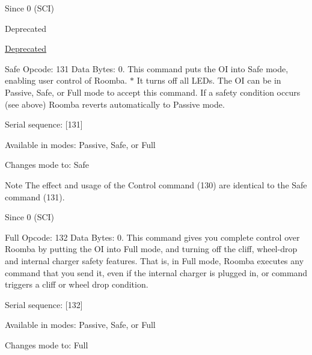 \begin{Desc}
\begin{description}
\begin{DoxySince}{Since}
0 (S\+C\+I)
\end{DoxySince}
\begin{DoxyRefDesc}{Deprecated}
\item[\hyperlink{deprecated__deprecated000001}{Deprecated}]\end{DoxyRefDesc}
\item[{\em 
\hypertarget{group__roomba-lib_gga305e17dfb7050ad83ea49ded2e6a2e24ae30c6c0f4e9ea706fea43c6098f35cec}{}R\+O\+O\+M\+B\+A\+\_\+\+S\+A\+F\+E\label{group__roomba-lib_gga305e17dfb7050ad83ea49ded2e6a2e24ae30c6c0f4e9ea706fea43c6098f35cec}
}]Safe Opcode\+: 131 Data Bytes\+: 0. This command puts the O\+I into Safe mode, enabling user control of Roomba. $\ast$ It turns off all L\+E\+Ds. The O\+I can be in Passive, Safe, or Full mode to accept this command. If a safety condition occurs (see above) Roomba reverts automatically to Passive mode.
\begin{DoxyItemize}
\item Serial sequence\+: \mbox{[}131\mbox{]}
\item Available in modes\+: Passive, Safe, or Full
\item Changes mode to\+: Safe
\end{DoxyItemize}

\begin{DoxyNote}{Note}
The effect and usage of the Control command (130) are identical to the Safe command (131).
\end{DoxyNote}
\begin{DoxySince}{Since}
0 (S\+C\+I) 
\end{DoxySince}
\item[{\em 
\hypertarget{group__roomba-lib_gga305e17dfb7050ad83ea49ded2e6a2e24a7ec5893abd5169837596b51b7a85c489}{}R\+O\+O\+M\+B\+A\+\_\+\+F\+U\+L\+L\label{group__roomba-lib_gga305e17dfb7050ad83ea49ded2e6a2e24a7ec5893abd5169837596b51b7a85c489}
}]Full Opcode\+: 132 Data Bytes\+: 0. This command gives you complete control over Roomba by putting the O\+I into Full mode, and turning off the cliff, wheel-\/drop and internal charger safety features. That is, in Full mode, Roomba executes any command that you send it, even if the internal charger is plugged in, or command triggers a cliff or wheel drop condition.
\begin{DoxyItemize}
\item Serial sequence\+: \mbox{[}132\mbox{]}
\item Available in modes\+: Passive, Safe, or Full
\item Changes mode to\+: Full
\end{DoxyItemize}


\end{description}
\end{Desc}
